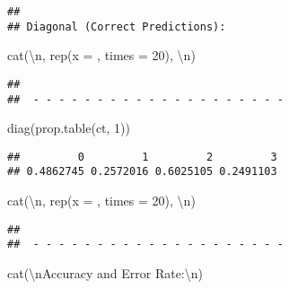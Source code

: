 \documentclass[
]{article}
\newenvironment{Shaded}{\begin{snugshade}}{\end{snugshade}}
\newcommand{\AttributeTok}[1]{\textcolor[rgb]{0.77,0.63,0.00}{#1}}
\newcommand{\DecValTok}[1]{\textcolor[rgb]{0.00,0.00,0.81}{#1}}
\newcommand{\FunctionTok}[1]{\textcolor[rgb]{0.00,0.00,0.00}{#1}}
\newcommand{\NormalTok}[1]{#1}
\newcommand{\SpecialCharTok}[1]{\textcolor[rgb]{0.00,0.00,0.00}{#1}}
\newcommand{\StringTok}[1]{\textcolor[rgb]{0.31,0.60,0.02}{#1}}
\begin{document}
\begin{verbatim}
## 
## Diagonal (Correct Predictions):
\end{verbatim}

\begin{Shaded}
\begin{Highlighting}[]
\FunctionTok{cat}\NormalTok{(}\StringTok{\textquotesingle{}}\SpecialCharTok{\textbackslash{}n}\StringTok{\textquotesingle{}}\NormalTok{, }\FunctionTok{rep}\NormalTok{(}\AttributeTok{x =} \StringTok{\textquotesingle{}{-}\textquotesingle{}}\NormalTok{, }\AttributeTok{times =} \DecValTok{20}\NormalTok{), }\StringTok{\textquotesingle{}}\SpecialCharTok{\textbackslash{}n}\StringTok{\textquotesingle{}}\NormalTok{)}
\end{Highlighting}
\end{Shaded}

\begin{verbatim}
## 
##  - - - - - - - - - - - - - - - - - - - -
\end{verbatim}

\begin{Shaded}
\begin{Highlighting}[]
\FunctionTok{diag}\NormalTok{(}\FunctionTok{prop.table}\NormalTok{(ct, }\DecValTok{1}\NormalTok{))}
\end{Highlighting}
\end{Shaded}

\begin{verbatim}
##         0         1         2         3 
## 0.4862745 0.2572016 0.6025105 0.2491103
\end{verbatim}

\begin{Shaded}
\begin{Highlighting}[]
\FunctionTok{cat}\NormalTok{(}\StringTok{\textquotesingle{}}\SpecialCharTok{\textbackslash{}n}\StringTok{\textquotesingle{}}\NormalTok{, }\FunctionTok{rep}\NormalTok{(}\AttributeTok{x =} \StringTok{\textquotesingle{}{-}\textquotesingle{}}\NormalTok{, }\AttributeTok{times =} \DecValTok{20}\NormalTok{), }\StringTok{\textquotesingle{}}\SpecialCharTok{\textbackslash{}n}\StringTok{\textquotesingle{}}\NormalTok{)}
\end{Highlighting}
\end{Shaded}

\begin{verbatim}
## 
##  - - - - - - - - - - - - - - - - - - - -
\end{verbatim}

\begin{Shaded}
\begin{Highlighting}[]
\FunctionTok{cat}\NormalTok{(}\StringTok{\textquotesingle{}}\SpecialCharTok{\textbackslash{}n}\StringTok{Accuracy and Error Rate:}\SpecialCharTok{\textbackslash{}n}\StringTok{\textquotesingle{}}\NormalTok{)}
\end{Highlighting}
\end{Shaded}
\end{document}
